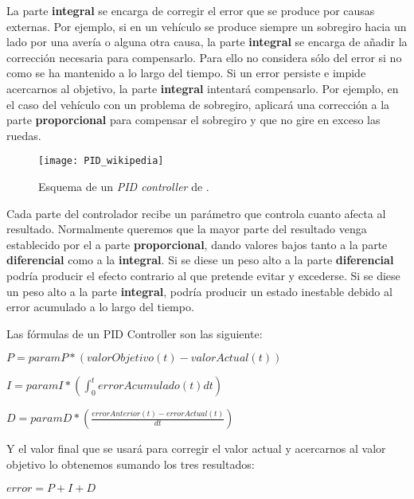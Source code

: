 La parte \textbf{integral} se encarga de corregir el error que se produce por causas externas. Por ejemplo, si en un vehículo se produce siempre un sobregiro hacia un lado por una avería o alguna otra causa, la parte \textbf{integral} se encarga de añadir la corrección necesaria para compensarlo. Para ello no considera sólo del error si no como se ha mantenido a lo largo del tiempo. Si un error persiste e impide acercarnos al objetivo, la parte \textbf{integral} intentará compensarlo. Por ejemplo, en el caso del vehículo con un problema de sobregiro, aplicará una corrección a la parte \textbf{proporcional} para compensar el sobregiro y que no gire en exceso las ruedas.

\begin{figure}[htpb]
    \centering
    \texttt{[image: PID\_wikipedia]}
    \caption[Esquema de un \textit{PID controller}]{Esquema de un \textit{PID controller} de \cite{wiki:pidimagen}.}
    \label{fig:basics AFM sketch}
\end{figure}

Cada parte del controlador recibe un parámetro que controla cuanto afecta al resultado. Normalmente queremos que la mayor parte del resultado venga establecido por el a parte \textbf{proporcional}, dando valores bajos tanto a la parte \textbf{diferencial} como a la \textbf{integral}. Si se diese un peso alto a la parte \textbf{diferencial} podría producir el efecto contrario al que pretende evitar y excederse. Si se diese un peso alto a la parte \textbf{integral}, podría producir un estado inestable debido al error acumulado a lo largo del tiempo.

Las fórmulas de un PID Controller son las siguiente:
\begin{center}
$P = paramP * (valorObjetivo(t) - valorActual(t))$

$I = paramI * (\displaystyle \int_{0}^{t} errorAcumulado(t) dt)$

$D = paramD * (\displaystyle \frac{errorAnterior(t)-errorActual(t)}{dt})$
\end{center}

Y el valor final que se usará para corregir el valor actual y acercarnos al valor objetivo lo obtenemos sumando los tres resultados:
\begin{center}
$error = P + I + D$
\end{center}